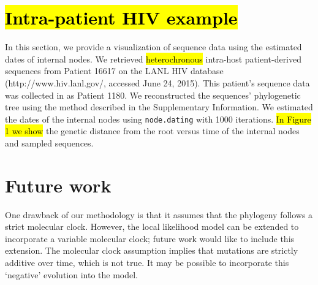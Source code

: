 \documentclass{bioinfo}
\newcommand{\code}[1]{{\tt #1}}
\newcommand{\edit}[1]{\hl{#1}}
\begin{document}
\vspace*{-18pt}

\section{\edit{Intra-patient HIV example}} \label{sec:vis}
In this section, we provide a visualization of sequence data using the estimated dates of internal nodes.
We retrieved \edit{heterochronous} intra-host patient-derived sequences from Patient 16617 on the LANL HIV database (http://www.hiv.lanl.gov/, accessed June 24, 2015).
This patient's sequence data was collected in \cite{Llewellyn06} as Patient 1180.
We reconstructed the sequences' phylogenetic tree using the method described in the Supplementary Information.
We\edit{ }estimated the dates of the internal nodes using \code{node.dating} with 1000 iterations. 
\edit{In Figure 1 we show} the genetic distance from the root versus time of the internal nodes and sampled sequences.

\vspace*{-18pt}

\section{Future work} \label{sec:discuss}
One drawback of our methodology is that it assumes that the phylogeny follows a strict molecular clock.
However, the local likelihood model can be extended to incorporate a variable molecular clock; future work would like to include this extension.
The molecular clock assumption implies that mutations are strictly additive over time, which is not true.
It may be possible to incorporate this `negative' evolution into the model.
\end{document}
